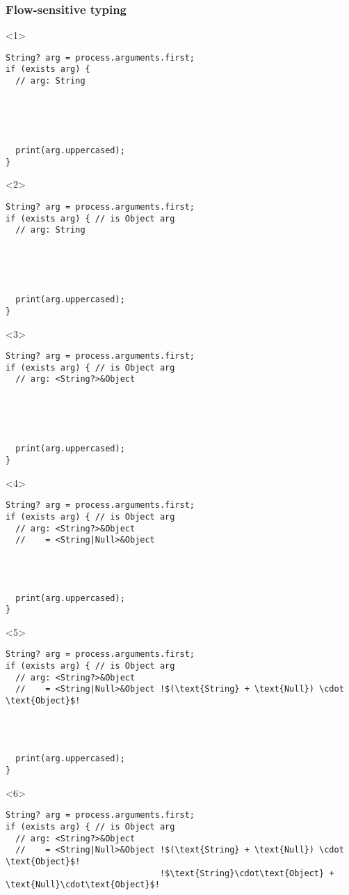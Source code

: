 \documentclass[aspectratio=169]{beamer}
\begin{document}
\begin{frame}[fragile]
  \frametitle{Flow-sensitive typing}
  \begin{onlyenv}<1>
    \begin{lstlisting}
String? arg = process.arguments.first;
if (exists arg) {
  // arg: String





  print(arg.uppercased);
}
    \end{lstlisting}
  \end{onlyenv}
  \begin{onlyenv}<2>
    \begin{lstlisting}
String? arg = process.arguments.first;
if (exists arg) { // is Object arg
  // arg: String





  print(arg.uppercased);
}
    \end{lstlisting}
  \end{onlyenv}
  \begin{onlyenv}<3>
    \begin{lstlisting}
String? arg = process.arguments.first;
if (exists arg) { // is Object arg
  // arg: <String?>&Object





  print(arg.uppercased);
}
    \end{lstlisting}
  \end{onlyenv}
  \begin{onlyenv}<4>
    \begin{lstlisting}
String? arg = process.arguments.first;
if (exists arg) { // is Object arg
  // arg: <String?>&Object
  //    = <String|Null>&Object




  print(arg.uppercased);
}
    \end{lstlisting}
  \end{onlyenv}
  \begin{onlyenv}<5>
    \begin{lstlisting}[escapechar=!]
String? arg = process.arguments.first;
if (exists arg) { // is Object arg
  // arg: <String?>&Object
  //    = <String|Null>&Object !$(\text{String} + \text{Null}) \cdot \text{Object}$!




  print(arg.uppercased);
}
    \end{lstlisting}
  \end{onlyenv}
  \begin{onlyenv}<6>
    \begin{lstlisting}[escapechar=!]
String? arg = process.arguments.first;
if (exists arg) { // is Object arg
  // arg: <String?>&Object
  //    = <String|Null>&Object !$(\text{String} + \text{Null}) \cdot \text{Object}$!
                               !$\text{String}\cdot\text{Object} + \text{Null}\cdot\text{Object}$!




\end{lstlisting}
\end{onlyenv}
\end{frame}
\end{document}
